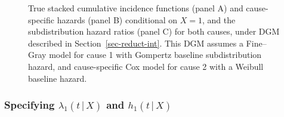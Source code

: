 \documentclass[
  letterpaper,
  DIV=11,
  numbers=noendperiod]{scrreprt}
\newcommand{\given}{\,|\,}
\begin{document}
\begin{figure}


\caption{\label{fig-reduc}True stacked cumulative incidence functions
(panel A) and cause-specific hazards (panel B) conditional on \(X = 1\),
and the subdistribution hazard ratios (panel C) for both causes, under
DGM described in Section~\ref{sec-reduct-int}. This DGM assumes a
Fine--Gray model for cause 1 with Gompertz baseline subdistribution
hazard, and cause-specific Cox model for cause 2 with a Weibull baseline
hazard.}

\end{figure}%

\subsubsection{\texorpdfstring{Specifying \(\lambda_1(t \given X)\) and
\(h_1(t \given X)\)}{Specifying \textbackslash lambda\_1(t \textbackslash given X) and h\_1(t \textbackslash given X)}}\label{specifying-lambda_1t-given-x-and-h_1t-given-x}
\end{document}
